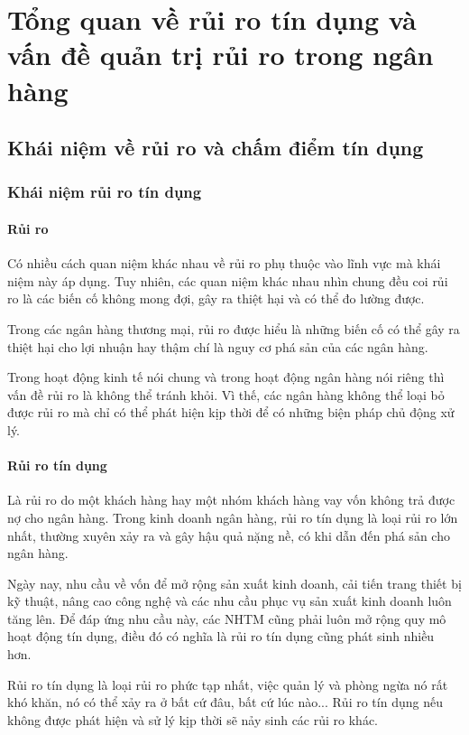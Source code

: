\section{Tổng quan về rủi ro tín dụng và vấn đề quản trị rủi ro trong ngân hàng}
\subsection{Khái niệm về rủi ro và chấm điểm tín dụng}
\subsubsection{Khái niệm rủi ro tín dụng}
\paragraph{Rủi ro}
Có nhiều cách quan niệm khác nhau về rủi ro phụ thuộc vào lĩnh vực mà khái niệm này áp dụng.  Tuy nhiên, các quan niệm khác nhau nhìn chung đều coi rủi ro là các biến cố không mong đợi, gây ra thiệt hại và có thể đo lường được.

Trong các ngân hàng thương mại, rủi ro được hiểu là những biến cố có thể gây ra thiệt hại cho lợi nhuận hay thậm chí là nguy cơ phá sản của các ngân hàng.

Trong hoạt động kinh tế nói chung và trong hoạt động ngân hàng nói riêng thì vấn đề rủi ro là không thể tránh khỏi. Vì thế, các ngân hàng  không thể loại bỏ được rủi ro mà chỉ có thể phát hiện kịp thời để có những biện pháp chủ động xử lý.

\paragraph{Rủi ro tín dụng}
Là rủi ro do một khách hàng hay một nhóm khách hàng vay vốn không trả được nợ cho ngân hàng. Trong kinh doanh ngân hàng, rủi ro tín dụng là loại rủi ro lớn nhất, thường xuyên xảy ra và gây hậu quả nặng nề, có khi dẫn đến phá sản cho ngân hàng.

Ngày nay, nhu cầu về vốn để mở rộng sản xuất kinh doanh, cải tiến trang thiết bị kỹ thuật, nâng cao công nghệ và các nhu cầu phục vụ sản xuất kinh doanh luôn tăng lên. Để đáp ứng nhu cầu này, các NHTM cũng phải luôn mở rộng quy mô hoạt động tín dụng, điều đó có nghĩa là rủi ro tín dụng cũng phát sinh nhiều hơn.

Rủi ro tín dụng là loại rủi ro phức tạp nhất, việc quản lý và phòng ngừa nó rất khó khăn, nó có thể xảy ra ở bất cứ đâu, bất cứ lúc nào... Rủi ro tín dụng nếu không được phát hiện và sử lý kịp thời sẽ nảy sinh các rủi ro khác.

